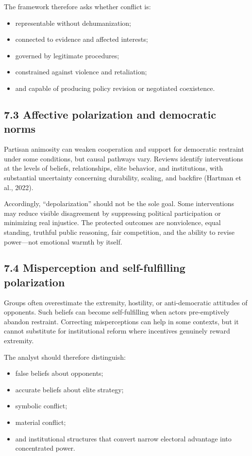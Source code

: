 \documentclass[
  11pt,
]{article}
\providecommand{\tightlist}{%
  \setlength{\itemsep}{0pt}\setlength{\parskip}{0pt}}
\begin{document}
The framework therefore asks whether conflict is:

\begin{itemize}
\tightlist
\item
  representable without dehumanization;
\item
  connected to evidence and affected interests;
\item
  governed by legitimate procedures;
\item
  constrained against violence and retaliation;
\item
  and capable of producing policy revision or negotiated coexistence.
\end{itemize}

\subsection{7.3 Affective polarization and democratic
norms}\label{affective-polarization-and-democratic-norms}

Partisan animosity can weaken cooperation and support for democratic
restraint under some conditions, but causal pathways vary. Reviews
identify interventions at the levels of beliefs, relationships, elite
behavior, and institutions, with substantial uncertainty concerning
durability, scaling, and backfire (Hartman et al., 2022).

Accordingly, ``depolarization'' should not be the sole goal. Some
interventions may reduce visible disagreement by suppressing political
participation or minimizing real injustice. The protected outcomes are
nonviolence, equal standing, truthful public reasoning, fair
competition, and the ability to revise power---not emotional warmth by
itself.

\subsection{7.4 Misperception and self-fulfilling
polarization}\label{misperception-and-self-fulfilling-polarization}

Groups often overestimate the extremity, hostility, or anti-democratic
attitudes of opponents. Such beliefs can become self-fulfilling when
actors pre-emptively abandon restraint. Correcting misperceptions can
help in some contexts, but it cannot substitute for institutional reform
where incentives genuinely reward extremity.

The analyst should therefore distinguish:

\begin{itemize}
\tightlist
\item
  false beliefs about opponents;
\item
  accurate beliefs about elite strategy;
\item
  symbolic conflict;
\item
  material conflict;
\item
  and institutional structures that convert narrow electoral advantage
  into concentrated power.
\end{itemize}
\end{document}
